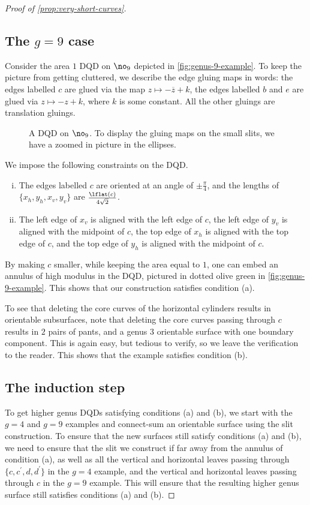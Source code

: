 \documentclass[12pt, reqno]{amsart}
\begin{document}
\begin{proof}[Proof of \autoref{prop:very-short-curves}]
\subsection*{The $g=9$ case}
Consider the area $1$ DQD on $\no_9$ depicted in \autoref{fig:genus-9-example}.
To keep the picture from getting cluttered, we describe the edge gluing maps in words: the edges labelled $c$ are glued via the map $z \mapsto -\overline{z} + k$, the edges labelled $b$ and $e$ are glued via $z \mapsto -z + k$, where $k$ is some constant.
All the other gluings are translation gluings.
\begin{figure}[h]
  \centering
  \caption{A DQD on $\no_9$. To display the gluing maps on the small slits, we have a zoomed in picture in the ellipses.}
  \label{fig:genus-9-example}
\end{figure}
We impose the following constraints on the DQD.
\begin{enumerate}[(i)]
\item The edges labelled $c$ are oriented at an angle of $\pm \frac{\pi}{4}$, and the lengths of $\{x_h, y_h, x_v, y_v\}$ are $\frac{\lflat(c)}{4\sqrt{2}}$.
\item The left edge of $x_v$ is aligned with the left edge of $c$, the left edge of $y_v$ is aligned with the midpoint of $c$, the top edge of $x_h$ is aligned with the top edge of $c$, and the top edge of $y_h$ is aligned with the midpoint of $c$.
\end{enumerate}
By making $c$ smaller, while keeping the area equal to $1$, one can embed an annulus of high modulus in the DQD, pictured in dotted olive green in \autoref{fig:genus-9-example}.
This shows that our construction satisfies condition (a).

To see that deleting the core curves of the horizontal cylinders results in orientable subsurfaces, note that deleting the core curves passing through $c$ results in $2$ pairs of pants, and a genus $3$ orientable surface with one boundary component.
This is again easy, but tedious to verify, so we leave the verification to the reader.
This shows that the example satisfies condition (b).

\subsection*{The induction step}
To get higher genus DQDs satisfying conditions (a) and (b), we start with the $g=4$ and $g=9$ examples and connect-sum an orientable surface using the slit construction.
To ensure that the new surfaces still satisfy conditions (a) and (b), we need to ensure that the slit we construct if far away from the annulus of condition (a), as well as all the vertical and horizontal leaves passing through $\{c, c^{\prime}, d, d^{\prime}\}$ in the $g=4$ example, and the vertical and horizontal leaves passing through $c$ in the $g=9$ example.
This will ensure that the resulting higher genus surface still satisfies conditions (a) and (b).
\end{proof}
\end{document}

